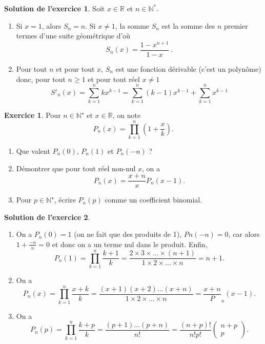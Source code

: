 \documentclass[a4paper, 11pt,openany]{article}%
\theoremstyle{plain}
\theoremstyle{definition}
\newtheorem{exo}{Exercice}
\newtheorem{sol}{Solution de l'exercice}
\theoremstyle{remark}
\newcommand{\R}{\mathbb{R}}
\newcommand{\N}{\mathbb{N}}
\begin{document}
\begin{sol}
	Soit $x\in \R$ et $n\in \N^*$.
	\begin{enumerate}
		\item Si $x=1$, alors $S_n = n$. Si $x\ne 1$, la somme $S_n$ est la somme des $n$ premier termes d'une suite géométrique d'où 
		\[
			S_n(x) = \frac{1-x^{n+1}}{1-x} \ .
		\]
		\item Pour tout $n$ et pour tout $x$, $S_n$ est une fonction dérivable (c'est un polynôme) donc, pour tout $n\geqslant 1$ et pour tout réel $x\ne 1$
		\[
			S'_n(x) = \sum_{k=1}^n kx^{k-1} = \sum_{k=1}^n (k-1)x^{k-1} + \sum_{k=1}^n x^{k-1}
		\]
	\end{enumerate}
\end{sol}

\begin{exo}
Pour $n \in \N^{\star}$ et $x \in \R$, on note $$P_n(x)= \prod_{k=1}^n \left(1+ \frac{x}{k} \right).$$
\begin{enumerate}
\item Que valent $P_n(0)$, $P_n(1)$ et $P_n(-n)$ ?
\item Démontrer que pour tout réel non-nul $x$, on a $$P_n(x)= \frac{x+n}{x} P_n(x-1).$$
\item Pour $p \in \N^{\star}$, écrire $P_n(p)$ comme un coefficient binomial.
\end{enumerate}
\end{exo}

\begin{sol}
	\begin{enumerate}
		\item On a $P_n(0)=1$ (on ne fait que des produits de 1), $Pn(-n)=0$, car alors $1+\frac{-n}{n}=0$ et donc on a un terme nul dans le produit. Enfin, 
		\[ P_n(1)= \prod_{k=1}^n  \frac{k+1}{k} = \frac{2 \times 3 \times ... \times (n+1)}{1 \times 2 \times ... \times n} = n+1.\]
		\item On a 
		$$P_n(x)= \prod_{k=1}^n \frac{x+k}{k} = \frac{(x+1) (x+2) ... (x+n)}{1 \times 2 \times ... \times n } = \frac{x+n} P_n(x-1).$$
				\item On a 
		$$P_n(p)= \prod_{k=1}^n \frac{k+p}{k} = \frac{(p+1) ... (p+n)}{n!} = \frac{(n+p)!}{n! p!} \begin{pmatrix} n+p \\ p \end{pmatrix}.$$
	\end{enumerate}
\end{sol}
\end{document}
